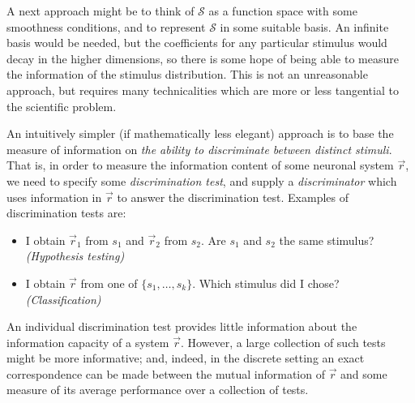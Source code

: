 \documentclass[12pt]{article}
\begin{document}
A next approach might be to think of $\mathcal{S}$ as a function space
with some smoothness conditions, and to represent $\mathcal{S}$ in
some suitable basis.  An infinite basis would be needed, but the
coefficients for any particular stimulus would decay in the higher
dimensions, so there is some hope of being able to measure the
information of the stimulus distribution.  This is not an unreasonable
approach, but requires many technicalities which are more or less
tangential to the scientific problem.

An intuitively simpler (if mathematically less elegant) approach is to
base the measure of information on \emph{the ability to discriminate
between distinct stimuli}.  That is, in order to measure the
information content of some neuronal system $\vec{r}$, we need to
specify some \emph{discrimination test}, and supply
a \emph{discriminator} which uses information in $\vec{r}$ to answer
the discrimination test.  Examples of discrimination tests are:
\begin{itemize}
\item I obtain $\vec{r}_1$ from $s_1$ and $\vec{r}_2$ from $s_2$.  Are $s_1$ and $s_2$ the same stimulus? \emph{(Hypothesis testing)}
\item I obtain $\vec{r}$ from one of $\{s_1,\hdots, s_k\}$.  Which stimulus did I chose? \emph{(Classification)}
\end{itemize}
An individual discrimination test provides little information about
the information capacity of a system $\vec{r}$. However, a large
collection of such tests might be more informative; and, indeed, in
the discrete setting an exact correspondence can be made between the
mutual information of $\vec{r}$ and some measure of its average
performance over a collection of tests.
\end{document}
